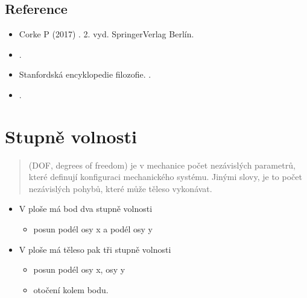 \documentclass[letterpaper,10pt,english]{jupyterBook}
\begin{document}
\subsection{Reference}
\label{\detokenize{Prednasky/0_3_Sou_u0159adnicov_xe9_syst_xe9my:reference}}\begin{itemize}
\item {} 
\sphinxAtStartPar
Corke P (2017) . 2. vyd. Springer\sphinxhyphen{}Verlag Berlín.

\item {} 
\sphinxAtStartPar
{}.

\item {} 
\sphinxAtStartPar
Stanfordská encyklopedie filozofie. .

\item {} 
\sphinxAtStartPar
{}.

\end{itemize}

\sphinxstepscope


\section{Stupně volnosti}
\label{\detokenize{Prednasky/1_1_Stupe_u0148_volnosti:stupne-volnosti}}\label{\detokenize{Prednasky/1_1_Stupe_u0148_volnosti::doc}}\begin{quote}

\sphinxAtStartPar
{} (DOF, degrees of freedom) je v mechanice počet nezávislých parametrů, které definují konfiguraci mechanického systému. Jinými slovy, je to počet nezávislých pohybů, které může těleso vykonávat.
\end{quote}
\begin{itemize}
\item {} 
\sphinxAtStartPar
V ploše má bod dva stupně volnosti
\begin{itemize}
\item {} 
\sphinxAtStartPar
posun podél osy x a podél osy y

\end{itemize}

\item {} 
\sphinxAtStartPar
V ploše má těleso pak tři stupně volnosti
\begin{itemize}
\item {} 
\sphinxAtStartPar
posun podél osy x, osy y

\item {} 
\sphinxAtStartPar
otočení kolem bodu.

\end{itemize}

\end{itemize}
\end{document}
